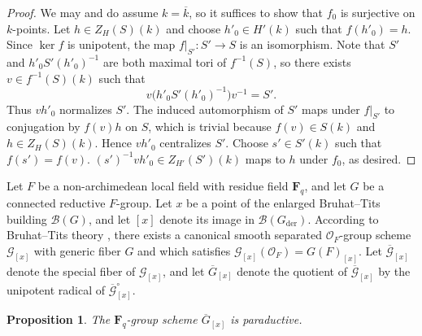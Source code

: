 \documentclass[reqno]{amsart}
\numberwithin{equation}{subsection}
\newcommand{\F}{\mathbf{F}}
\newcommand{\ol}[1]{\overline{#1}}
\newcommand{\co}{\colon}
\newcommand\cB{\mathcal{B}}
\newcommand\cG{\mathcal{G}}
\newcommand\cO{\mathcal{O}}
\DeclareMathOperator{\der}{der}
\newtheorem{prop}[thm]{Proposition}
\theoremstyle{remark}
\numberwithin{equation}{subsection}
\numberwithin{figure}{subsection}
\begin{document}
\begin{proof}
    We may and do assume $k = \ol k$, so it suffices to show that $f_0$ is surjective on $k$-points. Let $h \in Z_H(S)(k)$ and choose $h'_0 \in H'(k)$ such that $f(h'_0) = h$. Since $\ker f$ is unipotent, the map $f|_{S'}\co S' \to S$ is an isomorphism. Note that $S'$ and $h'_0S'(h'_0)^{-1}$ are both maximal tori of $f^{-1}(S)$, so there exists $v \in f^{-1}(S)(k)$ such that
    \[
    v\bigl(h'_0S'(h'_0)^{-1}\bigr)v^{-1}=S'.
    \]
    Thus $vh'_0$ normalizes $S'$. The induced automorphism of $S'$ maps under $f|_{S'}$ to conjugation by $f(v)h$ on $S$, which is trivial because $f(v) \in S(k)$ and $h \in Z_H(S)(k)$. Hence $vh'_0$ centralizes $S'$. Choose $s' \in S'(k)$ such that $f(s')=f(v)$. $(s')^{-1}vh'_0 \in Z_{H'}(S')(k)$ maps to $h$ under $f_0$, as desired.
\end{proof}

Let $F$ be a non-archimedean local field with residue field $\F_q$, and let $G$ be a connected reductive $F$-group. Let $x$ be a point of the enlarged Bruhat--Tits building $\cB(G)$, and let $[x]$ denote its image in $\cB(G_{\der})$. According to Bruhat--Tits theory \cite[Remark 8.3.4]{KP}, there exists a canonical smooth separated $\cO_F$-group scheme $\cG_{[x]}$ with generic fiber $G$ and which satisfies $\cG_{[x]}(\cO_F) = G(F)_{[x]}$. Let $\ol\cG_{[x]}$ denote the special fiber of $\cG_{[x]}$, and let $\ol G_{[x]}$ denote the quotient of $\ol\cG_{[x]}$ by the unipotent radical of $\ol\cG_{[x]}^\circ$.

\begin{prop}\label{prop:main-paraductive-example}
    The $\F_q$-group scheme $\ol G_{[x]}$ is paraductive.
\end{prop}
\end{document}
